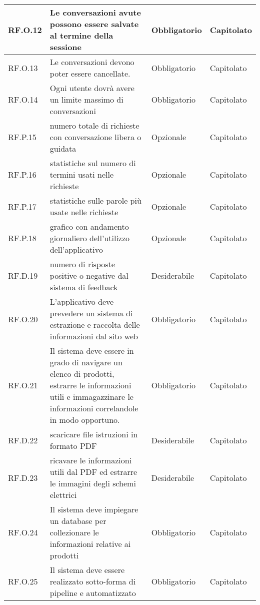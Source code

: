\begin{longtable}{|C{2.7cm}|L{7.2cm}|C{2.7cm}|C{2cm}|}
         \hline
         RF.O.12 & Le conversazioni avute possono essere salvate al termine della sessione & Obbligatorio & Capitolato \\
        \hline
        RF.O.13 & Le conversazioni devono poter essere cancellate. & Obbligatorio & Capitolato \\
        \hline
        RF.O.14 & Ogni utente dovrà avere un limite massimo di conversazioni
         & Obbligatorio & Capitolato \\
        \hline
        RF.P.15 & numero totale di richieste con conversazione libera o guidata
         & Opzionale & Capitolato \\
        \hline
        RF.P.16 & statistiche sul numero di termini usati nelle richieste
         & Opzionale & Capitolato \\
        \hline
        RF.P.17 & statistiche sulle parole più usate nelle richieste
         & Opzionale & Capitolato \\
        \hline
        RF.P.18 & grafico con andamento giornaliero dell’utilizzo dell’applicativo
         & Opzionale & Capitolato \\
        \hline
        RF.D.19 & numero di risposte positive o negative dal sistema di feedback
         & Desiderabile & Capitolato \\
        \hline
        RF.O.20 &  L’applicativo deve prevedere un sistema di estrazione e raccolta delle informazioni dal sito web
         & Obbligatorio & Capitolato \\
        \hline
         RF.O.21 & Il sistema deve essere in grado di navigare un elenco di prodotti, estrarre le informazioni utili e immagazzinare le informazioni correlandole in modo opportuno.
         & Obbligatorio & Capitolato \\
        \hline
         RF.D.22 & scaricare file istruzioni in formato PDF
         & Desiderabile & Capitolato \\
        \hline
         RF.D.23 & ricavare le informazioni utili dal PDF ed estrarre le immagini degli schemi elettrici
         & Desiderabile & Capitolato \\
        \hline
         RF.O.24 & Il sistema deve impiegare un database per collezionare le informazioni relative ai prodotti
         & Obbligatorio & Capitolato \\
        \hline
         RF.O.25 & Il sistema deve essere realizzato sotto-forma di pipeline e automatizzato
         & Obbligatorio & Capitolato \\
        \hline

\end{longtable}
